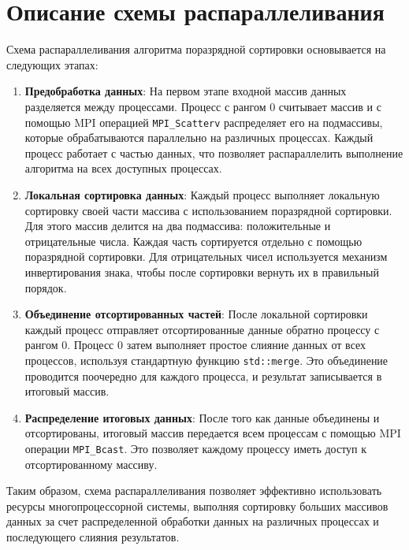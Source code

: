 \documentclass[12pt]{article}
\begin{document}
\section{Описание схемы распараллеливания}

\hspace*{1.25em}Схема распараллеливания алгоритма поразрядной сортировки основывается на следующих этапах:

\begin{enumerate}
    \item \textbf{Предобработка данных}: На первом этапе входной массив данных разделяется между процессами. Процесс с рангом $0$ считывает массив и с помощью MPI операцией \texttt{MPI\_Scatterv} распределяет его на подмассивы, которые обрабатываются параллельно на различных процессах. Каждый процесс работает с частью данных, что позволяет распараллелить выполнение алгоритма на всех доступных процессах.

    \item \textbf{Локальная сортировка данных}: Каждый процесс выполняет локальную сортировку своей части массива с использованием поразрядной сортировки. Для этого массив делится на два подмассива: положительные и отрицательные числа. Каждая часть сортируется отдельно с помощью поразрядной сортировки. Для отрицательных чисел используется механизм инвертирования знака, чтобы после сортировки вернуть их в правильный порядок.

    \item \textbf{Объединение отсортированных частей}: После локальной сортировки каждый процесс отправляет отсортированные данные обратно процессу с рангом $0$. Процесс $0$ затем выполняет простое слияние данных от всех процессов, используя стандартную функцию \texttt{std::merge}. Это объединение проводится поочередно для каждого процесса, и результат записывается в итоговый массив.

    \item \textbf{Распределение итоговых данных}: После того как данные объединены и отсортированы, итоговый массив передается всем процессам с помощью MPI операции \texttt{MPI\_Bcast}. Это позволяет каждому процессу иметь доступ к отсортированному массиву.
\end{enumerate}

\hspace*{1.25em}Таким образом, схема распараллеливания позволяет эффективно использовать ресурсы многопроцессорной системы, выполняя сортировку больших массивов данных за счет распределенной обработки данных на различных процессах и последующего слияния результатов.
\end{document}
